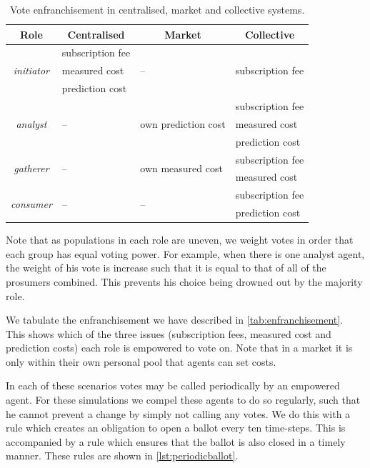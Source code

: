 \begin{table}
\centering
\caption{Vote enfranchisement in centralised, market and collective systems.}\label{tab:enfranchisement}
\begin{tabularx}{\textwidth}{c|lll}
Role & \multicolumn{1}{c}{Centralised} & \multicolumn{1}{c}{Market} & \multicolumn{1}{c}{Collective} \\
\hline
\multirow{3}{*}{\emph{initiator}} & subscription fee & \multirow{3}{*}{--} & \multirow{3}{*}{subscription fee} \\
& measured cost & & \\
& prediction cost & & \\
\multirow{3}{*}{\emph{analyst}} & \multirow{3}{*}{--} &  \multirow{3}{*}{own prediction cost} & subscription fee \\
& & & measured cost \\
& & & prediction cost \\
\multirow{2}{*}{\emph{gatherer}} & \multirow{2}{*}{--} & \multirow{2}{*}{own measured cost} & subscription fee \\
& & & measured cost \\
\multirow{2}{*}{\emph{consumer}} & \multirow{2}{*}{--} & \multirow{2}{*}{--} & subscription fee \\
& & & prediction cost \\
\end{tabularx}
\end{table}

Note that as populations in each role are uneven, we weight votes in order
that each group has equal voting power. For example, when there is one analyst
agent, the weight of his vote is increase such that it is equal to that of all
of the prosumers combined. This prevents his choice being drowned out by the
majority role.

We tabulate the enfranchisement we have described in
\autoref{tab:enfranchisement}. This shows which of the three issues
(subscription fees, measured cost and prediction costs) each role is empowered
to vote on. Note that in a market it is only within their own personal pool
that agents can set costs.

In each of these scenarios votes may be called periodically by an empowered
agent. For these simulations we compel these agents to do so regularly, such
that he cannot prevent a change by simply not calling any votes. We do this
with a rule which creates an obligation to open a ballot every ten time-steps.
This is accompanied by a  rule which ensures that the ballot is also closed in
a timely manner. These rules are shown in \autoref{lst:periodicballot}.

